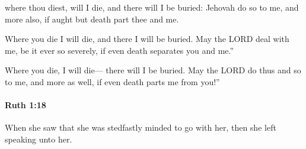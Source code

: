 			\begin{versebox}
					\item[BHS] 
					\item[LXX] 
					\item[ASV] where thou diest, will I die, and there will I be buried: Jehovah do so to me, and more also, if aught but death part thee and me.
					\item[NIV] Where you die I will die, and there I will be buried. May the LORD deal with me, be it ever so severely, if even death separates you and me.”
					\item[NRSV] Where you die, I will die— there will I be buried. May the LORD do thus and so to me, and more as well, if even death parts me from you!”
			\end{versebox}

		\paragraph{Ruth 1:18} %
			\label{RUTH-1-18}

			When she saw that she was stedfastly minded to go with her, then she left speaking unto her.

